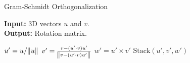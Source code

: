 \begin{algorithm}[H]

\caption{Gram-Schmidt Orthogonalization}\label{alg:gram_schmidt} 

\begin{flushleft}
    \hspace*{\algorithmicindent} \textbf{Input:} 3D vectors $u$ and $v$. \\
    \hspace*{\algorithmicindent} \textbf{Output:} Rotation matrix. \\
\end{flushleft}

\begin{algorithmic}[1]

    \State $u' = u / \norm{u}$
    \State $v' = \frac{v - (u' \cdot v) u'}{\norm{v - (u' \cdot v) u'}} $
    \State $w' = u' \times v'$
    \State \Return $\mathrm{Stack}(u', v', w')$

\end{algorithmic}

\end{algorithm}